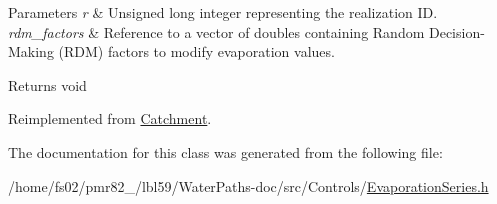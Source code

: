 \begin{DoxyParams}{Parameters}
{\em r} & Unsigned long integer representing the realization ID. \\
\hline
{\em rdm\+\_\+factors} & Reference to a vector of doubles containing Random Decision-\/\+Making (R\+DM) factors to modify evaporation values.\\
\hline
\end{DoxyParams}
\begin{DoxyReturn}{Returns}
void 
\end{DoxyReturn}


Reimplemented from \mbox{\hyperlink{classCatchment_ad76654af47dcd69bcb795c1c152409cc}{Catchment}}.



The documentation for this class was generated from the following file\+:\begin{DoxyCompactItemize}
\item 
/home/fs02/pmr82\+\_/lbl59/\+Water\+Paths-\/doc/src/\+Controls/\mbox{\hyperlink{EvaporationSeries_8h}{Evaporation\+Series.\+h}}\end{DoxyCompactItemize}
